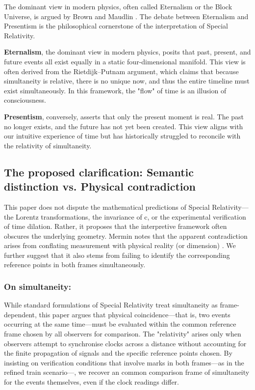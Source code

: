 \documentclass[pdflatex,sn-basic]{sn-jnl}
\theoremstyle{thmstyleone}%
\theoremstyle{thmstyletwo}%
\theoremstyle{thmstylethree}%
\begin{document}
The dominant view in modern physics, often called Eternalism or the Block Universe, is argued by Brown \cite{brown2005} and Maudlin \cite{maudlin2012}. The debate between Eternalism and Presentism is the philosophical cornerstone of the interpretation of Special Relativity. 

		\textbf{Eternalism}, the dominant view in modern physics, posits that past, present, and future events all exist equally in a static four-dimensional manifold. This view is often derived from the Rietdijk–Putnam argument, which claims that because simultaneity is relative, there is no unique now, and thus the entire timeline must exist simultaneously. In this framework, the "flow" of time is an illusion of consciousness.

		\textbf{Presentism}, conversely, asserts that only the present moment is real. The past no longer exists, and the future has not yet been created. This view aligns with our intuitive experience of time but has historically struggled to reconcile with the relativity of simultaneity.
	\subsection{The proposed clarification: Semantic distinction vs. Physical contradiction}\label{subsec5_2}
	This paper does not dispute the mathematical predictions of Special Relativity—the Lorentz transformations, the invariance of c, or the experimental verification of time dilation. Rather, it proposes that the interpretive framework often obscures the underlying geometry. Mermin notes that the apparent contradiction arises from conflating measurement with physical reality (or dimension) \cite{mermin1984}. We further suggest that it also stems from failing to identify the corresponding reference points in both frames simultaneously.
	\subsubsection{On simultaneity:}\label{subsubsec5_2_1}
While standard formulations of Special Relativity treat simultaneity as frame-dependent, this paper argues that physical coincidence—that is, two events occurring at the same time—must be evaluated within the common reference frame chosen by all observers for comparison. The "relativity" arises only when observers attempt to synchronise clocks across a distance without accounting for the finite propagation of signals and the specific reference points chosen. By insisting on verification conditions that involve marks in both frames—as in the refined train scenario—, we recover an common comparison frame of simultaneity for the events themselves, even if the clock readings differ.
\end{document}
